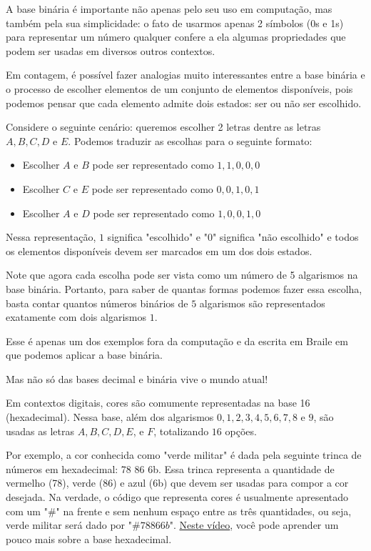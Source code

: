 \label{comp-arr6}

A base binária é importante não apenas pelo seu uso em computação, mas também pela sua simplicidade: o fato de usarmos apenas 2 símbolos (0s e 1s) para representar um número qualquer confere a ela algumas propriedades que podem ser usadas em diversos outros contextos.

Em contagem, é possível fazer analogias muito interessantes entre a base binária e o processo de escolher  elementos de um conjunto de  elementos disponíveis, pois podemos pensar que cada elemento admite dois estados: ser ou não ser escolhido.

Considere o seguinte cenário: queremos escolher 2 letras dentre as letras $A, B, C, D \text{ e } E$. Podemos traduzir as escolhas para o seguinte formato:

\begin{itemize}
\item Escolher $A$ e $B$ pode ser representado como $1,1,0,0,0$
\item Escolher $C$ e $E$ pode ser representado como $0,0,1,0,1$
\item Escolher $A$ e $D$ pode ser representado como $1,0,0,1,0$
\end{itemize}

Nessa representação, $1$ significa "escolhido"{} e "$0$"{} significa "não escolhido"{} e todos os elementos disponíveis devem ser marcados em um dos dois estados.

Note que agora cada escolha pode ser vista como um número de 5 algarismos na base binária. Portanto, para saber de quantas formas podemos fazer essa escolha, basta contar quantos números binários de $5$ algarismos são representados exatamente com dois algarismos $1$.

Esse é apenas um dos exemplos fora da computação e da escrita em Braile em que podemos aplicar a base binária.


\label{comp-know4}

Mas não só das bases decimal e binária vive o mundo atual!

Em contextos digitais, cores são comumente representadas na base 16 (hexadecimal). Nessa base, além dos algarismos $0, 1, 2, 3, 4, 5, 6, 7, 8$ e $9$, são usadas as letras $A, B, C, D, E$, e $F$, totalizando $16$ opções.

Por exemplo, a cor conhecida como "verde militar"{} é dada pela seguinte trinca de números em hexadecimal: 78 86 6b. Essa trinca representa a quantidade de vermelho (78), verde (86) e azul (6b) que devem ser usadas para compor a cor desejada. Na verdade, o código que representa cores é usualmente apresentado com um "\#"{} na frente e sem nenhum espaço entre as três quantidades, ou seja, verde militar será dado por "$\#78866b$". \href{https://www.youtube.com/watch?v=uuUzkqSxCz4}{Neste vídeo}, você pode aprender um pouco mais sobre a base hexadecimal.

